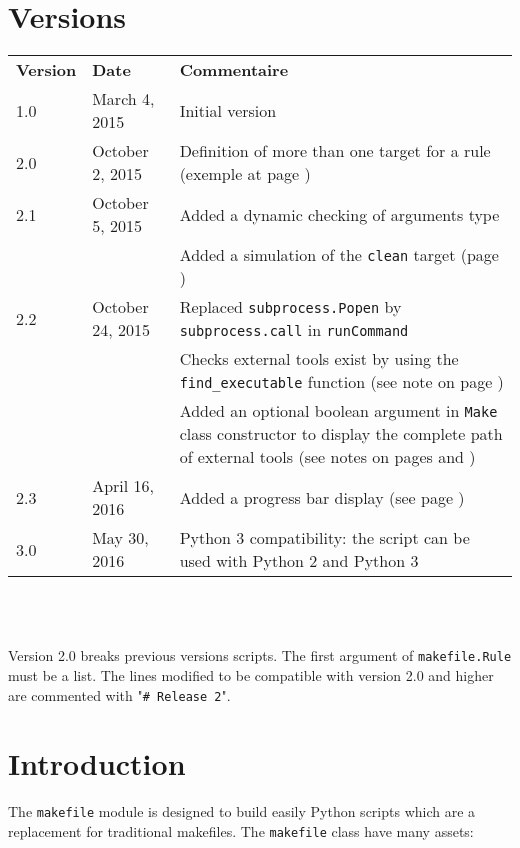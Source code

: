 \documentclass[a4paper,11pt]{extarticle}
\begin{document}
\section{Versions}
  \begin{tabular}{llp{10.5cm}}
    \textbf{Version} & \textbf{Date} & \textbf{Commentaire}\\
    1.0 & March 4, 2015 & Initial version \\
    2.0 & October 2, 2015 & Definition of more than one target for a rule (exemple at page \pageref{plusieursCibles})\\
    2.1 & October 5, 2015 & Added a dynamic checking of arguments type\\
        &                & Added a simulation of the \texttt{clean} target (page \pageref{simulationButClean})\\
    2.2 & October 24, 2015 & Replaced \texttt{subprocess.Popen} by \texttt{subprocess.call} in \texttt{runCommand}\\
        &                & Checks external tools exist by using the \texttt{find\_executable} function (see note on page \pageref{verifUtilitaire})\\
        &                & Added an optional boolean argument in \texttt{Make} class constructor to display the complete path of external tools (see notes on pages \pageref{logUtilityToolPath} and \pageref{logUtilityToolPath2})\\
    2.3 & April 16, 2016 & Added a progress bar display (see page \pageref{affichagePourcentage})\\
    3.0 & May 30, 2016 & Python 3 compatibility: the script can be used with Python 2 and Python 3\\
  \end{tabular}
\\~

Version 2.0 breaks previous versions scripts. The first argument of \texttt{makefile.Rule} must be a list. The lines modified to be compatible with version 2.0 and higher are commented with "\texttt{\# Release 2}".


\section{Introduction}

The \texttt{makefile} module is designed to build easily Python scripts which are a replacement for traditional makefiles. The \texttt{makefile} class have many assets:
\end{document}
